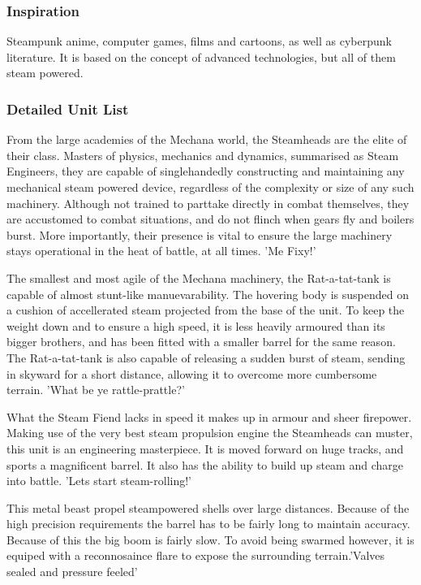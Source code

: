 \documentclass[a4paper,twocolumn]{article}
\begin{document}
\subsubsection{Inspiration}

Steampunk anime, computer games, films and cartoons, as well as cyberpunk literature. It is based on the concept of advanced technologies, but all of them steam powered.

\subsubsection{Detailed Unit List}

From the large academies of the Mechana world, the Steamheads are the elite of their class. Masters of physics, mechanics and dynamics, summarised as Steam Engineers, they are capable of singlehandedly constructing and maintaining any mechanical steam powered device, regardless of the complexity or size of any such machinery. Although not trained to parttake directly in combat themselves, they are accustomed to combat situations, and do not flinch when gears fly and boilers burst. More importantly, their presence is vital to ensure the large machinery stays operational in the heat of battle, at all times. 'Me Fixy!'

The smallest and most agile of the Mechana machinery, the Rat-a-tat-tank is capable of almost stunt-like manuevarability. The hovering body is suspended on a cushion of accellerated steam projected from the base of the unit. To keep the weight down and to ensure a high speed, it is less heavily armoured than its bigger brothers, and has been fitted with a smaller barrel for the same reason. The Rat-a-tat-tank is also capable of releasing a sudden burst of steam, sending in skyward for a short distance, allowing it to overcome more cumbersome terrain. 'What be ye rattle-prattle?'

What the Steam Fiend lacks in speed it makes up in armour and sheer firepower. Making use of the very best steam propulsion engine the Steamheads can muster, this unit is an engineering masterpiece. It is moved forward on huge tracks, and sports a magnificent barrel. It also has the ability to build up steam and charge into battle. 'Lets start steam-rolling!'

This metal beast propel steampowered shells over large distances. Because of the high precision requirements the barrel has to be fairly long to maintain accuracy. Because of this the big boom is fairly slow. To avoid being swarmed however, it is equiped with a reconnosaince flare to expose the surrounding terrain.'Valves sealed and pressure feeled'
\end{document}
